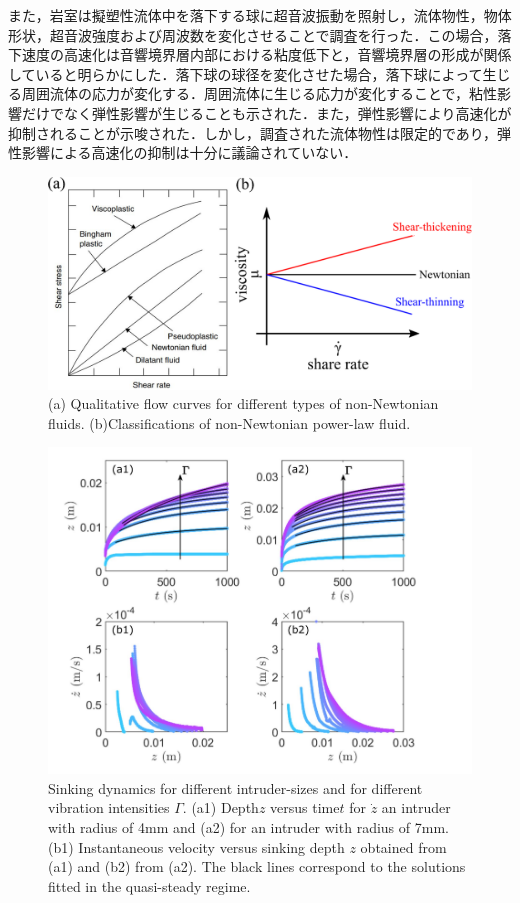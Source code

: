 また，岩室\cite{ref:8}は擬塑性流体中を落下する球に超音波振動を照射し，流体物性，物体形状，超音波強度および周波数を変化させることで調査を行った．この場合，落下速度の高速化は音響境界層内部における粘度低下と，音響境界層の形成が関係していると明らかにした．落下球の球径を変化させた場合，落下球によって生じる周囲流体の応力が変化する．周囲流体に生じる応力が変化することで，粘性影響だけでなく弾性影響が生じることも示された．また，弾性影響により高速化が抑制されることが示唆された．しかし，調査された流体物性は限定的であり，弾性影響による高速化の抑制は十分に議論されていない．
\begin{figure}[ht]
    \centering
    \includegraphics[width=1\textwidth]{1-Background/shea-thining.eps}
    \caption{(a) Qualitative flow curves for different types of non-Newtonian fluids\cite{ref:1}. (b)Classifications of non-Newtonian power-law fluid.}
    \label{fig:1-fluid-curve}
\end{figure}
\begin{figure}[ht]
    \begin{center}
        \includegraphics[width=12.0cm,clip]{1-Background/4-sinking.png}
        \caption{Sinking dynamics for different intruder-sizes and for different vibration intensities $\Gamma$. (a1) Depth$z$ versus time$t$ for $\dot{z}$ an intruder with radius of 4mm and (a2) for an intruder with radius of 7mm. (b1) Instantaneous velocity versus sinking depth $z$ obtained from (a1) and (b2) from (a2). The black lines correspond to the solutions fitted in the quasi-steady regime\cite{ref:6}.}
        \label{fig:4-sinking}
    \end{center}
\end{figure}
\newpage
